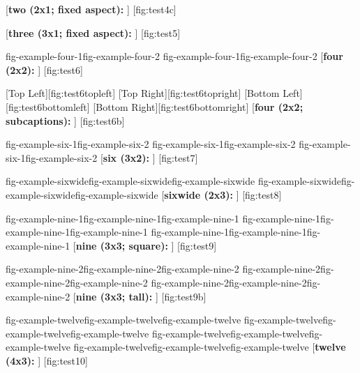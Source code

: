\figfloat
    {}
    [\textbf{two (2x1; fixed aspect):} \lipsum[1][1-4]]
    [fig:test4c]

\figfloat
    {}
    [\textbf{three (3x1; fixed aspect):} \lipsum[1][1-5]]
    [fig:test5]

\figfloat
    {
        \figfour
        {{fig-example-four-1}{fig-example-four-2}}
        {{fig-example-four-1}{fig-example-four-2}}
    }
    [\textbf{four (2x2):} \lipsum[1][1-5]]
    [fig:test6]

\figfloat
    {
        \figfour
        {
            {[Top Left][fig:test6topleft]}
            {[Top Right][fig:test6topright]}
        }{
            {[Bottom Left][fig:test6bottomleft]}
            {[Bottom Right][fig:test6bottomright]}
        }
    }
    [\textbf{four (2x2; subcaptions):} \lipsum[1][1-5]]
    [fig:test6b]

\figfloat
    {
        \figsix
        {{fig-example-six-1}{fig-example-six-2}}
        {{fig-example-six-1}{fig-example-six-2}}
        {{fig-example-six-1}{fig-example-six-2}}
    }
    [\textbf{six (3x2):} \lipsum[1][1-5]]
    [fig:test7]

\figfloat
    {
        \figsixwide
        {{fig-example-sixwide}{fig-example-sixwide}{fig-example-sixwide}}
        {{fig-example-sixwide}{fig-example-sixwide}{fig-example-sixwide}}
    }
    [\textbf{sixwide (2x3):} \lipsum[1][1-5]]
    [fig:test8]

\figfloat
    {
        \fignine
        {{fig-example-nine-1}{fig-example-nine-1}{fig-example-nine-1}}
        {{fig-example-nine-1}{fig-example-nine-1}{fig-example-nine-1}}
        {{fig-example-nine-1}{fig-example-nine-1}{fig-example-nine-1}}
    }
    [\textbf{nine (3x3; square):} \lipsum[1][1-4]]
    [fig:test9]

\figfloat
    {
        \fignine
        {{fig-example-nine-2}{fig-example-nine-2}{fig-example-nine-2}}
        {{fig-example-nine-2}{fig-example-nine-2}{fig-example-nine-2}}
        {{fig-example-nine-2}{fig-example-nine-2}{fig-example-nine-2}}
    }
    [\textbf{nine (3x3; tall):} \lipsum[1][1-5]]
    [fig:test9b]

\figfloat
    {
        \figtwelve
        {{fig-example-twelve}{fig-example-twelve}{fig-example-twelve}}
        {{fig-example-twelve}{fig-example-twelve}{fig-example-twelve}}
        {{fig-example-twelve}{fig-example-twelve}{fig-example-twelve}}
        {{fig-example-twelve}{fig-example-twelve}{fig-example-twelve}}
    }
    [\textbf{twelve (4x3):} \lipsum[1][1-5]]
    [fig:test10]

